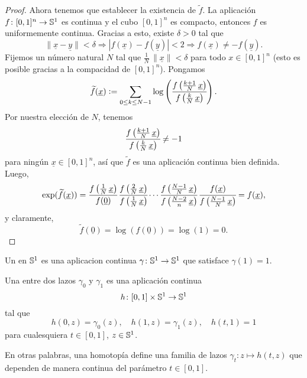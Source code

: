 \documentclass{article}
\numberwithin{equation}{section}
\begin{document}
\begin{nameless}
\begin{proof}
    Ahora tenemos que establecer la existencia de $\widetilde{f}$. La aplicación
    $f\colon [0,1]^n \to \mathbb{S}^1$ es continua y el cubo $[0,1]^n$ es compacto,
    entonces $f$ es uniformemente continua. Gracias a esto, existe $\delta > 0$
    tal que
    \[ \|\underline{x} - \underline{y}\| < \delta \Longrightarrow
      |f (\underline{x}) - f (\underline{y})| < 2 \Longrightarrow
      f (\underline{x}) \ne - f (\underline{y}). \]
    Fijemos un número natural $N$ tal que
    $\frac{1}{N} \, \|\underline{x}\| < \delta$ para todo $x \in [0,1]^n$ (esto
    es posible gracias a la compacidad de $[0,1]^n$). Pongamos
    $$\widetilde{f} (\underline{x}) \mathrel{\mathop:}= \sum_{0 \le k \le N-1} \log \left(\cfrac{f \left(\frac{k+1}{N}\,\underline{x}\right)}{f \left(\frac{k}{N}\,\underline{x}\right)}\right).$$
    Por nuestra elección de $N$, tenemos
    $$\cfrac{f \left(\frac{k+1}{N}\,\underline{x}\right)}{f \left(\frac{k}{N}\,\underline{x}\right)} \ne -1$$
    para ningún $\underline{x} \in [0,1]^n$, así que $\widetilde{f}$ es una
    aplicación continua bien definida. Luego,
    $$\exp (\widetilde{f} (\underline{x})) = \cfrac{f \left(\frac{1}{N}\,\underline{x}\right)}{f (\underline{0})} \, \cfrac{f \left(\frac{2}{N}\,\underline{x}\right)}{f \left(\frac{1}{N}\,\underline{x}\right)} \cdots \cfrac{f \left(\frac{N-1}{N}\,\underline{x}\right)}{f \left(\frac{N-2}{n}\,\underline{x}\right)}\,\cfrac{f (\underline{x})}{f \left(\frac{N-1}{N}\,\underline{x}\right)} = f (\underline{x}),$$
    y claramente,
    $$\widetilde{f} (\underline{0}) = \log (f (\underline{0})) = \log (1) = 0.$$
  \end{proof}
\end{nameless}

\begin{definicion}
  Un  en $\mathbb{S}^1$ es una aplicacion continua
  $\gamma\colon \mathbb{S}^1 \to \mathbb{S}^1$ que satisface $\gamma (1) = 1$.

  Una  entre dos lazos $\gamma_0$ y $\gamma_1$
  es una aplicación continua
  $$h\colon [0,1]\times \mathbb{S}^1 \to \mathbb{S}^1$$
  tal que
  $$h (0,z) = \gamma_0 (z), \quad h (1,z) = \gamma_1 (z), \quad h (t,1) = 1$$
  para cualesquiera $t \in [0,1]$, $z \in \mathbb{S}^1$.
\end{definicion}

En otras palabras, una homotopía define una familia de lazos
$\gamma_t\colon z \mapsto h (t,z)$ que dependen de manera continua del parámetro
$t \in [0,1]$.
\end{document}
